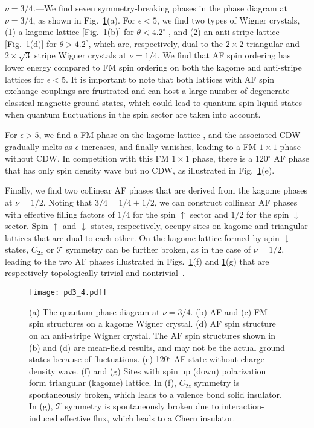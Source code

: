 \documentclass[aps,prl,floatfix,twocolumn]{revtex4-1}
\begin{document}
\textit{$\nu=3/4$.}---We find seven symmetry-breaking phases in the phase diagram at $ \nu=3/4 $, as shown in Fig.~\ref{fig:pd3,4}(a). For $
\epsilon <5$, we find two types of Wigner crystals, (1) a kagome lattice [Fig.~\ref{fig:pd3,4}(b)] for $\theta <4.2^{\circ}$ , and (2)  an anti-stripe lattice [Fig.~\ref{fig:pd3,4}(d)] for  $\theta >4.2^{\circ}$, which are, respectively, dual to the $2\times 2$ triangular and $2\times \sqrt{3}$ stripe Wigner crystals at $\nu=1/4$. We find that AF spin ordering has lower energy compared to FM spin ordering on both the kagome and anti-stripe lattices  for $ \epsilon <5$. It is important to note that both lattices with AF spin exchange couplings are frustrated and can host a large number of degenerate classical magnetic ground states, which could lead to quantum spin liquid states when quantum fluctuations in the spin sector are taken into account. 



For  $	\epsilon > 5$, we find a FM phase on the kagome lattice , and the associated CDW gradually melts as $\epsilon$ increases, and finally vanishes, leading to a FM $1\times 1$ phase without CDW. In competition with this FM $1\times 1$ phase, there is a 120$^{\circ}$ AF phase that has only spin density wave but no CDW, as illustrated in Fig.~\ref{fig:pd3,4}(e).

Finally, we find two collinear AF phases that are derived from the kagome phases at $\nu=1/2$. Noting that $3/4=1/4+1/2$, we can construct collinear AF phases with effective filling factors of $1/4$ for the spin $\uparrow$ sector and $1/2$ for the spin $\downarrow$ sector. Spin $\uparrow$ and $\downarrow$ states, respectively, occupy sites on kagome and triangular lattices that are dual to each other. On the kagome lattice formed by spin $\downarrow$ states, $C_{2z}$ or $\mathcal{T}$ symmetry can be further broken, as in the case of $\nu=1/2$, leading to the two AF phases illustrated in Figs.~\ref{fig:pd3,4}(f) and \ref{fig:pd3,4}(g) that are respectively topologically trivial and nontrivial~\cite{SM}.




\begin{figure}[t]
	\centering
	\texttt{[image: pd3\_4.pdf]}
	\caption{(a) The quantum phase diagram at  $ \nu=3/4 $. (b) AF and (c) FM spin structures on a kagome Wigner crystal. (d) AF spin structure on an anti-stripe Wigner crystal. The AF spin structures shown in (b) and (d) are mean-field results, and may not be the actual ground states because of fluctuations. (e) 120$^{\circ}$ AF state without charge density wave. (f) and (g) Sites with spin up (down) polarization form triangular (kagome) lattice. In (f), $C_{2z}$ symmetry is spontaneously broken, which leads to a valence bond solid insulator. In (g), $\mathcal{T}$ symmetry is spontaneously broken due to interaction-induced effective flux, which leads to a Chern insulator.}
	\label{fig:pd3,4}
\end{figure}
\end{document}
